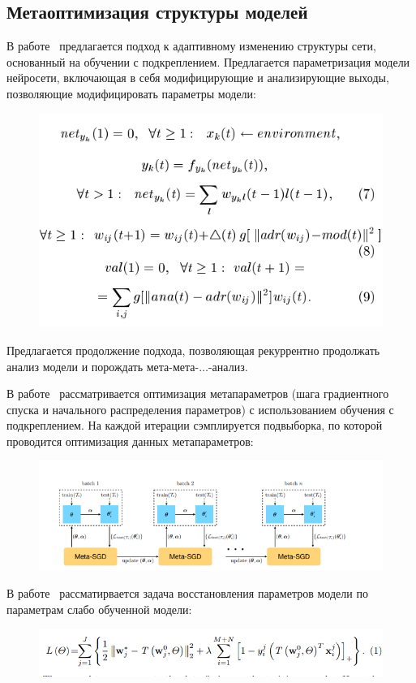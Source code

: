 \subsection{Метаоптимизация структуры моделей}
В работе~\cite{self_rnn} предлагается подход к адаптивному изменению структуры сети, основанный на обучении с подкреплением. Предлагается параметризация модели нейросети, включающая в себя модифицирующие и анализирующие выходы, позволяющие модифицировать параметры модели:
\begin{figure}[H]
\includegraphics[width=\textwidth]{./plots/arch_review_figs/self_rnn.png}
\end{figure}
Предлагается продолжение подхода, позволяющая рекуррентно продолжать анализ модели и порождать мета-мета-$\dots$-анализ.

В работе~\cite{meta_sgd} рассматривается оптимизация метапараметров (шага градиентного спуска и начального распределения параметров) с использованием обучения с подкреплением. На каждой итерации сэмплируется подвыборка, по которой проводится оптимизация данных метапараметров:
\begin{figure}[H]
\includegraphics[width=\textwidth]{./plots/arch_review_figs/meta_sgd.png}
\end{figure}

В работе~\cite{l2l} рассматирвается задача восстановления параметров модели по параметрам слабо обученной модели:
\begin{figure}[H]
\includegraphics[width=\textwidth]{./plots/arch_review_figs/l2l.png}
\end{figure}

